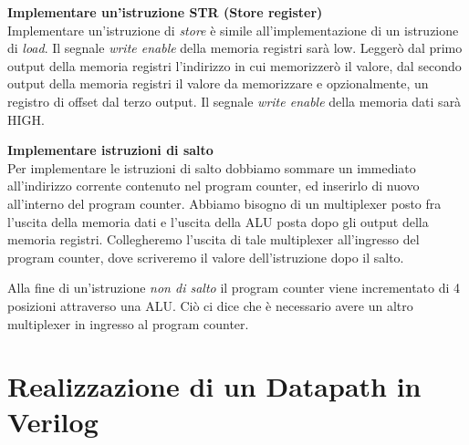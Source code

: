 \begin{defn}
\textbf{Implementare un'istruzione STR (Store register)} \\
Implementare un'istruzione di \textit{store} è simile all'implementazione di un
istruzione di \textit{load}. Il segnale \textit{write enable} della memoria
registri sarà low. Leggerò dal primo output della memoria registri l'indirizzo
in cui memorizzerò il valore, dal secondo output della memoria registri il
valore da memorizzare e opzionalmente, un registro di offset dal terzo output.
Il segnale \textit{write enable} della memoria dati sarà HIGH.
\end{defn}

\begin{defn}
\textbf{Implementare istruzioni di salto} \\
Per implementare le istruzioni di salto dobbiamo sommare un immediato
all'indirizzo corrente contenuto nel program counter, ed inserirlo di nuovo
all'interno del program counter. Abbiamo bisogno di un multiplexer posto fra
l'uscita della memoria dati e l'uscita della ALU posta dopo gli output della
memoria registri. Collegheremo l'uscita di tale multiplexer all'ingresso del
program counter, dove scriveremo il valore dell'istruzione dopo il salto.

Alla fine di un'istruzione \textit{non di salto} il program counter viene
incrementato di 4 posizioni attraverso una ALU. Ciò ci dice che è necessario
avere un altro multiplexer in ingresso al program counter.
\end{defn}

\section{Realizzazione di un Datapath in Verilog}







